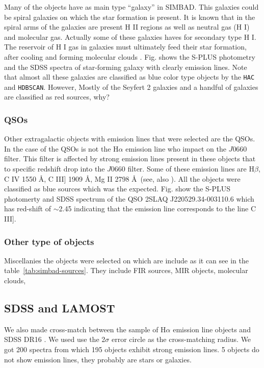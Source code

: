 \documentclass[fleqn,usenatbib]{mnras}
\begin{document}
Many of the objects have as main type ``galaxy'' in SIMBAD. This galaxies
could be spiral galaxies on which the star formation is present. It is known
that in the spiral arms of the galaxies are present H II regions as well as
neutral gas (H I) and molecular gas. Actually some of these galaxies haves for
secondary type H I. The reservoir of H I gas in galaxies must ultimately
feed their star formation, after cooling and forming molecular
clouds \citep{van-Driel:2016}. Fig. shows the S-PLUS photometry and
the SDSS spectra of star-forming galaxy with clearly emission lines.
Note that almost all these galaxies
are classified as blue color type objects by the \texttt{HAC} and \texttt{HDBSCAN}.
However, Mostly of the Seyfert 2 galaxies and a handful of galaxies are classified as
red sources, why?

\subsubsection{QSOs}
Other extragalactic objects with emission lines that were selected are the
QSOs. In the case of the QSOs is not the H{$\alpha$} emission line who impact
on the $J$0660 filter. This filter is affected by strong emission lines present in
these objects that to specific redshift drop into the $J$0660 filter.
Some of these emission lines are H{$\beta$}, C {\sc IV} 1550 \AA, C {\sc III]} 1909 \AA,
  Mg {\sc II} 2798 \AA~(see, also \citealp{Gutierrez:2020, Nakazono:2021}).
  All the objects were classified as blue sources which was the expected.
  Fig. show the S-PLUS photomerty and SDSS spectrum of the QSO 2SLAQ J220529.34-003110.6
  which has red-shift of $\sim$2.45 indicating that the emission line corresponds to
  the line C {\sc III]}.
  

  \subsubsection{Other type of objects}
  Miscellanies the objects were selected on which are include as it can see in the
  table~\ref{tab:simbad-sources}. They include FIR sources, MIR objects, molecular clouds, 

  

\subsection{SDSS and LAMOST}

We also made cross-match between the sample of H{$\alpha$} emission line objects and SDSS DR16
\citep{Ahumada:2020}. We used use the 2$\sigma$ error circle as the cross-matching radius.
We got 200 spectra from which 195 objects exhibit strong emission lines. 5 objects do not show
emission lines, they probably are stars or galaxies.
\end{document}
